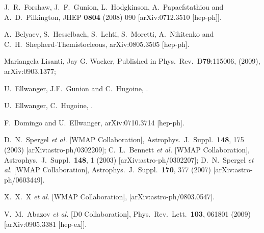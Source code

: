 \documentclass[aps,prl,twocolumn,nofootinbib,superscriptaddress]{revtex4}
\begin{document}
\begin{thebibliography}{99}
  J.~R.~Forshaw, J.~F.~Gunion, L.~Hodgkinson, A.~Papaefstathiou and A.~D.~Pilkington,
  JHEP {\bf 0804} (2008) 090
  [arXiv:0712.3510 [hep-ph]].  
  
  A.~Belyaev, S.~Hesselbach, S.~Lehti, S.~Moretti, 
  A.~Nikitenko and C.~H.~Shepherd-Themistocleous,
  arXiv:0805.3505 [hep-ph]. 
  

 Mariangela Lisanti, Jay G. Wacker, Published in Phys.\ Rev.\ D{\bf 79}:115006, (2009), arXiv:0903.1377;



 U.~Ellwanger, J.F.~Gunion and C.~Hugoine,
.

 U.~Ellwanger, C.~Hugoine, .

 F.~Domingo and U.~Ellwanger, arXiv:0710.3714 [hep-ph].

  D.~N.~Spergel {\it et al.}  [WMAP Collaboration],
  Astrophys.\ J.\ Suppl.\  {\bf 148}, 175 (2003)
  [arXiv:astro-ph/0302209];
%
  C.~L.~Bennett {\it et al.}  [WMAP Collaboration],
  Astrophys.\ J.\ Suppl.\  {\bf 148}, 1 (2003)
  [arXiv:astro-ph/0302207];
%
  D.~N.~Spergel {\it et al.}  [WMAP Collaboration],
  Astrophys.\ J.\ Suppl.\  {\bf 170}, 377 (2007)
  [arXiv:astro-ph/0603449].  

  X.~X.~X {\it et al.}  [WMAP Collaboration],
  [arXiv:astro-ph/0803.0547].  


  V.~M.~Abazov {\it et al.}  [D0 Collaboration],
  Phys.\ Rev.\ Lett.\  {\bf 103}, 061801 (2009)
  [arXiv:0905.3381 [hep-ex]].


\end{thebibliography}
\end{document}
